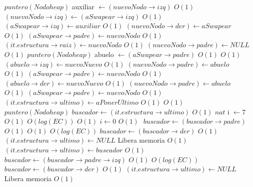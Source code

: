 \begin{Algoritmos}
\begin{algorithmic}[1]
									\State $puntero(Nodoheap)$ auxiliar $\gets (nuevoNodo \rightarrow izq)$ \Comment $O(1)$
									\State $(nuevoNodo \rightarrow izq) \gets (aSwapear \rightarrow izq)$ \Comment $O(1)$
									\State $(aSwapear \rightarrow izq) \gets auxiliar$ \Comment $O(1)$
								\EndIf
							\EndIf
						\State $(nuevoNodo \rightarrow der) \gets aSwapear$ \Comment $O(1)$
					\EndIf	
					\State $(aSwapear \rightarrow padre) \gets nuevoNodo$ \Comment $O(1)$
					\State $(it.estructura \rightarrow raiz) \gets nuevoNodo$	 \Comment $O(1)$
					\State $(nuevoNodo \rightarrow padre) \gets NULL$			 \Comment $O(1)$
					\Else
					\State $puntero(Nodoheap)$ abuelo $\gets (aSwapear \rightarrow padre)$ \Comment $O(1)$
						 \Comment $O(1)$
							\State $(abuelo \rightarrow izq) \gets nuevoNuevo$ \Comment $O(1)$
							\State $(nuevoNodo \rightarrow padre) \gets abuelo$ \Comment $O(1)$
							\State $(aSwapear \rightarrow padre) \gets nuevoNodo$ \Comment $O(1)$
						\Else
							\State $(abuelo \rightarrow der) \gets nuevoNuevo$ \Comment $O(1)$
							\State $(nuevoNodo \rightarrow padre) \gets abuelo$ \Comment $O(1)$
							\State $(aSwapear \rightarrow padre) \gets nuevoNodo$ \Comment $O(1)$
						\EndIf
					\EndIf
	\EndIf	
	\State $(it.estructura \rightarrow ultimo) \gets aPonerUltimo$	\Comment $O(1)$
				 \Comment $O(1)$
					\State $puntero(Nodoheap)$ $buscador \gets (it.estructura \rightarrow ultimo)$ \Comment $O(1)$
					\State $nat$ i $\gets 7$ \Comment $O(1)$
					 \Comment $O(log(EC))$
						 \Comment $O(1)$
							\State $i \gets 0$ \Comment $O(1)$
						\Else$ $ $buscador \gets (buscador \rightarrow padre)$ \Comment $O(1)$
						\EndIf
					\EndWhile
					 \Comment $O(1)$
						 \Comment $O(log(EC))$
							\State $buscador \gets (buscador \rightarrow der)$ \Comment $O(1)$
						\EndWhile
						\State $(it.estructura \rightarrow ultimo) \gets NULL$ \Comment Libera memoria $O(1)$						
						\State $(it.estructura \rightarrow ultimo) \gets buscador$ \Comment $O(1)$
					\Else $buscador \gets (buscador \rightarrow padre \rightarrow izq)$ \Comment $O(1)$
						 \Comment $O(log(EC))$
							\State $buscador \gets (buscador \rightarrow der)$ \Comment $O(1)$
						\EndWhile
						\State $(it.estructura \rightarrow ultimo) \gets NULL$ \Comment Libera memoria $O(1)$						

\end{algorithmic}
\end{Algoritmos}

